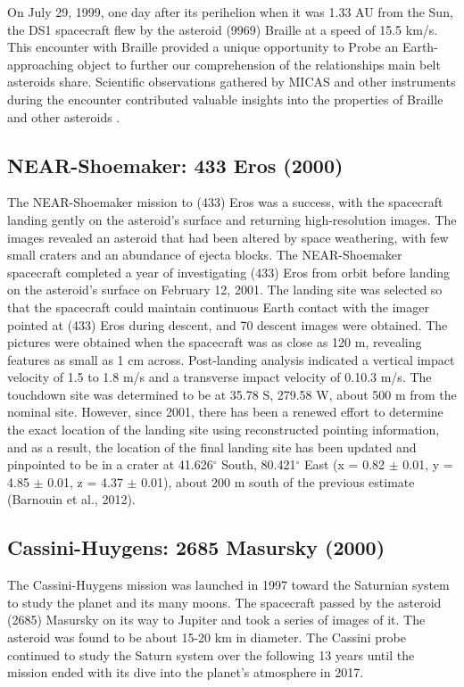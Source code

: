 On July 29, 1999, one day after its perihelion when it was 1.33 AU from the Sun, the \Gls{DS1} spacecraft flew by the asteroid (9969) Braille at a speed of 15.5 km/s. This encounter with Braille provided a unique opportunity to Probe an Earth-approaching object to further our comprehension of the relationships main belt asteroids share. Scientific observations gathered by MICAS and other instruments during the encounter contributed valuable insights into the properties of Braille and other asteroids \cite{Buratti2004}. 

\subsection{NEAR-Shoemaker: 433 Eros (2000)}

The NEAR-Shoemaker mission to (433) Eros was a success, with the spacecraft landing gently on the asteroid's surface and returning high-resolution images. The images revealed an asteroid that had been altered by space weathering, with few small craters and an abundance of ejecta blocks. The NEAR-Shoemaker spacecraft completed a year of investigating (433) Eros from orbit before landing on the asteroid's surface on February 12, 2001. The landing site was selected so that the spacecraft could maintain continuous Earth contact with the imager pointed at (433) Eros during descent, and 70 descent images were obtained. The pictures were obtained when the spacecraft was as close as 120 m, revealing features as small as 1 cm across. Post-landing analysis indicated a vertical impact velocity of 1.5 to 1.8 m/s and a transverse impact velocity of 0.1\textemdash{}0.3 m/s. The touchdown site was determined to be at 35.78 S, 279.58 W, about 500 m from the nominal site. However, since 2001, there has been a renewed effort to determine the exact location of the landing site using reconstructed pointing information, and as a result, the location of the final landing site has been updated and pinpointed to be in a crater at 41.626$^{\circ}$ South, 80.421$^{\circ}$ East (x = 0.82 $\pm$ 0.01, y = 4.85 $\pm$ 0.01, z = 4.37 $\pm$ 0.01), about 200 m south of the previous estimate (Barnouin et al., 2012).

\subsection{Cassini-Huygens: 2685 Masursky (2000)}

The Cassini-Huygens mission was launched in 1997 toward the Saturnian system to study the planet and its many moons. The spacecraft passed by the asteroid (2685) Masursky on its way to Jupiter and took a series of images of it. The asteroid was found to be about 15-20 km in diameter. The Cassini probe continued to study the Saturn system over the following 13 years until the mission ended with its dive into the planet's atmosphere in 2017.

